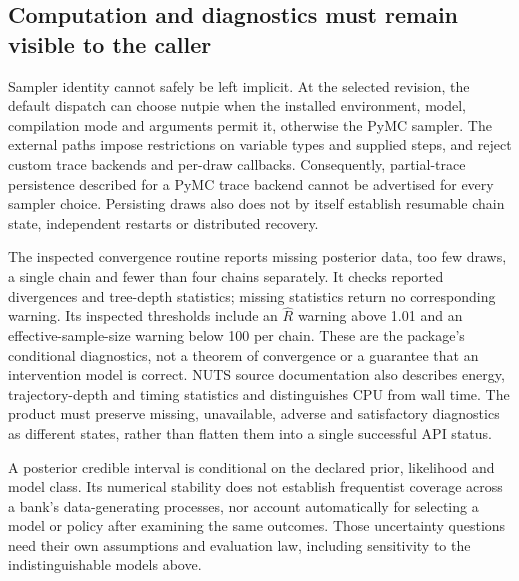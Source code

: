 \subsection{Computation and diagnostics must remain visible to the caller}
\label{exec23:pymc-decision}

Sampler identity cannot safely be left implicit. At the selected revision,
the default dispatch can choose nutpie when the installed environment, model,
compilation mode and arguments permit it, otherwise the PyMC sampler. The
external paths impose restrictions on variable types and supplied steps,
and reject custom trace backends and per-draw callbacks. Consequently,
partial-trace persistence described for a PyMC trace backend cannot be
advertised for every sampler choice. Persisting draws also does not by itself
establish resumable chain state, independent restarts or distributed recovery.
\citep{exec23_pymc_sources}

The inspected convergence routine reports missing posterior data, too few
draws, a single chain and fewer than four chains separately. It checks
reported divergences and tree-depth statistics; missing statistics return no
corresponding warning. Its inspected thresholds include an $\widehat R$
warning above 1.01 and an effective-sample-size warning below 100 per chain.
These are the package's conditional diagnostics, not a theorem of convergence
or a guarantee that an intervention model is correct. NUTS source documentation
also describes energy, trajectory-depth and timing statistics and distinguishes
CPU from wall time. The product must preserve missing, unavailable, adverse
and satisfactory diagnostics as different states, rather than flatten them
into a single successful API status.
\citep{exec23_pymc_sources}

A posterior credible interval is conditional on the declared prior,
likelihood and model class. Its numerical stability does not establish
frequentist coverage across a bank's data-generating processes, nor account
automatically for selecting a model or policy after examining the same
outcomes. Those uncertainty questions need their own assumptions and evaluation
law, including sensitivity to the indistinguishable models above.
\citep{exec23_pymc_reference}

